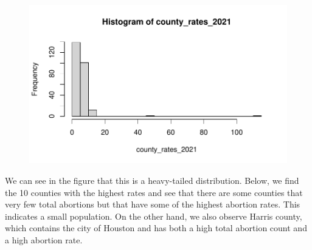 \documentclass[
  letterpaper,
]{krantz}
\makeatletter
\newenvironment{Shaded}{\begin{snugshade}}{\end{snugshade}}
\newcommand{\AttributeTok}[1]{\textcolor[rgb]{0.40,0.45,0.13}{#1}}
\newcommand{\DecValTok}[1]{\textcolor[rgb]{0.68,0.00,0.00}{#1}}
\newcommand{\FunctionTok}[1]{\textcolor[rgb]{0.28,0.35,0.67}{#1}}
\newcommand{\NormalTok}[1]{\textcolor[rgb]{0.00,0.23,0.31}{#1}}
\newcommand{\OtherTok}[1]{\textcolor[rgb]{0.00,0.23,0.31}{#1}}
\newcommand{\SpecialCharTok}[1]{\textcolor[rgb]{0.37,0.37,0.37}{#1}}
\newenvironment{kframe}{%
\medskip{}
\setlength{\fboxsep}{.8em}
 \def\at@end@of@kframe{}%
 \ifinner\ifhmode%
  \def\at@end@of@kframe{\end{minipage}}%
  \begin{minipage}{\columnwidth}%
 \fi\fi%
 \def\FrameCommand##1{\hskip\@totalleftmargin \hskip-\fboxsep
 \colorbox{shadecolor}{##1}\hskip-\fboxsep
     \hskip-\linewidth \hskip-\@totalleftmargin \hskip\columnwidth}%
 \MakeFramed {\advance\hsize-\width
   \@totalleftmargin\z@ \linewidth\hsize
   \@setminipage}}%
 {\par\unskip\endMakeFramed%
 \at@end@of@kframe}
\renewenvironment{Shaded}{\begin{kframe}}{\end{kframe}}
\makeatother
\begin{document}
\begin{Shaded}
\end{Shaded}

\begin{figure}[H]

{\centering \includegraphics[width=1\textwidth,height=\textheight]{book/9_hypothesis_tests_files/figure-pdf/unnamed-chunk-2-1.pdf}

}

\end{figure}

We can see in the figure that this is a heavy-tailed distribution.
Below, we find the 10 counties with the highest rates and see that there
are some counties that very few total abortions but that have some of
the highest abortion rates. This indicates a small population. On the
other hand, we also observe Harris county, which contains the city of
Houston and has both a high total abortion count and a high abortion
rate.
\end{document}
